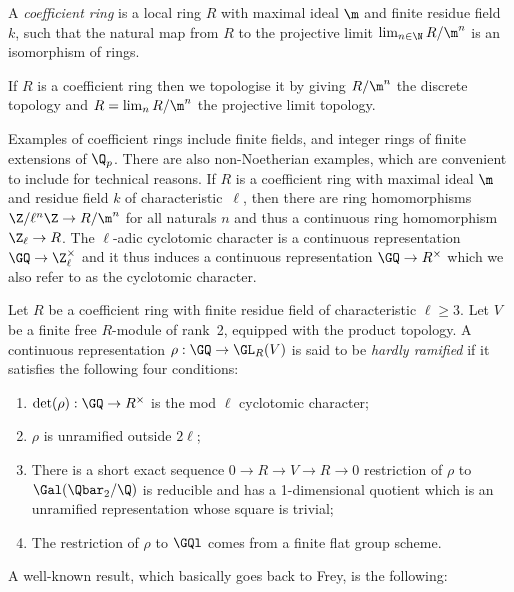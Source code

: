\begin{definition} A \emph{coefficient ring} is a local ring $R$ with maximal ideal $\m$ and
  finite residue field $k$, such that the natural map from $R$ to the projective
  limit $\lim_{n\in\N} R/\m^n$ is an isomorphism of rings.
\end{definition}

If $R$ is a coefficient ring then we topologise it by giving $R/\m^n$ the discrete
topology and $R=\lim_n R/\m^n$ the projective limit topology.

Examples of coefficient rings include finite fields, and integer rings of finite extensions
of $\Q_p$. There are also non-Noetherian examples, which are convenient to include
for technical reasons. If $R$ is a coefficient ring with maximal ideal $\m$
and residue field $k$ of characteristic~$\ell$, then there are ring homomorphisms
$\Z/\ell^n\Z\to R/\m^n$ for all naturals $n$ and thus a continuous ring homomorphism
$\Z_{\ell}\to R$. The $\ell$-adic cyclotomic character is a continuous
representation $\GQ\to\Z_{\ell}^\times$ and it thus induces a continuous
representation $\GQ\to R^\times$ which we also refer to as the cyclotomic character.

\begin{definition}
  \label{hardly_ramified}
  Let $R$ be a coefficient ring with finite residue field of characteristic $\ell\geq3$.
  Let $V$ be a finite free $R$-module of rank~2, equipped with the product topology. A
  continuous representation $\rho: \GQ\to \GL_R(V)$ is said to be \emph{hardly ramified} if it
  satisfies the following four conditions:
  \begin{enumerate}
  \item $\det(\rho):\GQ\to R^\times$ is the mod $\ell$ cyclotomic character;
  \item $\rho$ is unramified outside $2\ell$;
  \item There is a short exact sequence $0\to R\to V\to R\to 0$ restriction of $\rho$ to $\Gal(\Qbar_2/\Q)$ is reducible and has a
    1-dimensional quotient which is an unramified representation whose square is trivial;
  \item The restriction of $\rho$ to $\GQl$ comes from a finite flat group scheme.
  \end{enumerate}
\end{definition}

A well-known result, which basically goes back to Frey, is the following:

